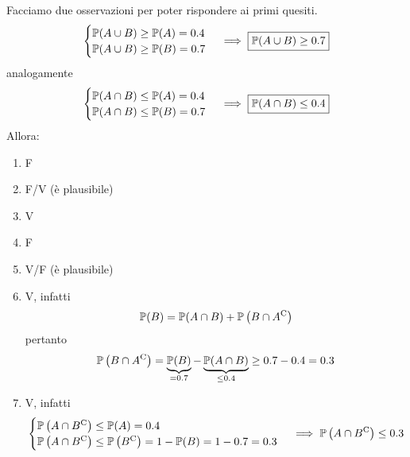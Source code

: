 Facciamo due osservazioni per poter rispondere ai primi quesiti.
\begin{equation*}
	\begin{cases}
		\mathbb{P}(A\cup B) \geq \mathbb{P}(A) =0.4\\
		\mathbb{P}(A\cup B) \geq \mathbb{P}(B) =0.7
	\end{cases}
	\implies \boxed{\mathbb{P}(A\cup B) \geq 0.7}
\end{equation*}
analogamente
\begin{equation*}
	\begin{cases}
		\mathbb{P}(A\cap B) \leq \mathbb{P}(A) =0.4\\
		\mathbb{P}(A\cap B) \leq \mathbb{P}(B) =0.7
	\end{cases}
	\implies \boxed{\mathbb{P}(A\cap B) \leq 0.4}
\end{equation*}
Allora:
\begin{enumerate}
	\item F
	\item F/V (è plausibile)
	\item V
	\item F
	\item V/F (è plausibile)
	\item V, infatti
	\begin{equation*}
		\mathbb{P}( B) =\mathbb{P}( A\cap B) +\mathbb{P}\left( B\cap A^{\mathrm{C}}\right)
	\end{equation*}
	pertanto
	\begin{equation*}
		\mathbb{P}\left( B\cap A^{\mathrm{C}}\right) =\underbrace{\mathbb{P}( B)}_{=0.7} -\underbrace{\mathbb{P}( A\cap B)}_{\leq 0.4} \geq 0.7-0.4=0.3
	\end{equation*}
	\item V, infatti
	\begin{equation*}
		\begin{cases}
			\mathbb{P}\left( A\cap B^{\mathrm{C}}\right) \leq \mathbb{P}( A) =0.4\\
			\mathbb{P}\left( A\cap B^{\mathrm{C}}\right) \leq \mathbb{P}\left( B^{\mathrm{C}}\right) =1-\mathbb{P}( B) =1-0.7=0.3
		\end{cases}
		\implies \mathbb{P}\left( A\cap B^{\mathrm{C}}\right) \leq 0.3
	\end{equation*}
\end{enumerate}

\Soluzione

